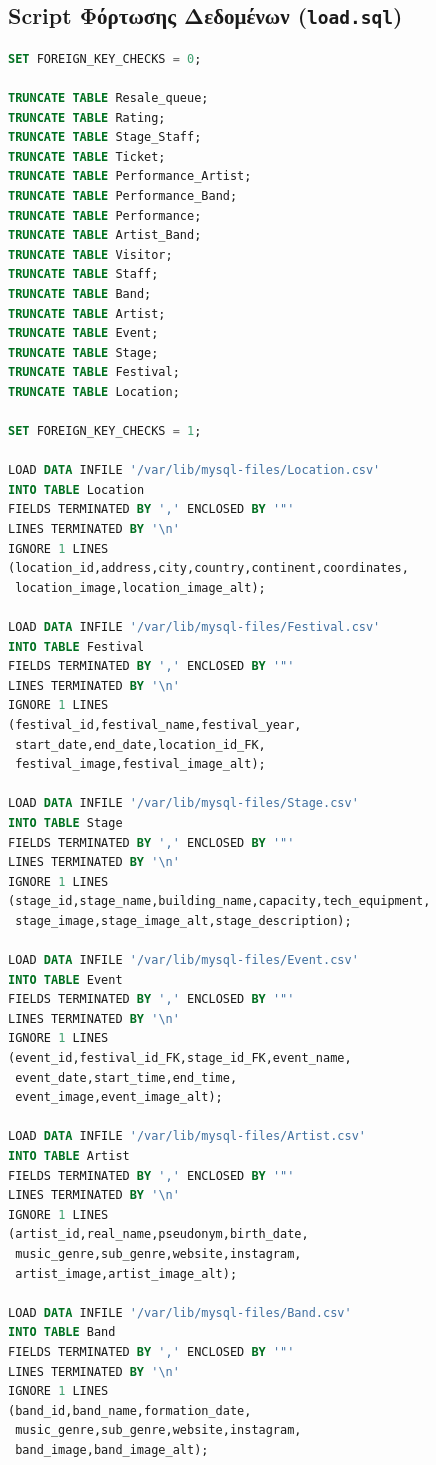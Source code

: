 \documentclass[a4paper,12pt]{article}
\begin{document}
\subsection{Script Φόρτωσης Δεδομένων (\texttt{load.sql})}
\begin{lstlisting}[language=SQL]
SET FOREIGN_KEY_CHECKS = 0;

TRUNCATE TABLE Resale_queue;
TRUNCATE TABLE Rating;
TRUNCATE TABLE Stage_Staff;
TRUNCATE TABLE Ticket;
TRUNCATE TABLE Performance_Artist;
TRUNCATE TABLE Performance_Band;
TRUNCATE TABLE Performance;
TRUNCATE TABLE Artist_Band;
TRUNCATE TABLE Visitor;
TRUNCATE TABLE Staff;
TRUNCATE TABLE Band;
TRUNCATE TABLE Artist;
TRUNCATE TABLE Event;
TRUNCATE TABLE Stage;
TRUNCATE TABLE Festival;
TRUNCATE TABLE Location;

SET FOREIGN_KEY_CHECKS = 1;

LOAD DATA INFILE '/var/lib/mysql-files/Location.csv'
INTO TABLE Location
FIELDS TERMINATED BY ',' ENCLOSED BY '"' 
LINES TERMINATED BY '\n'
IGNORE 1 LINES
(location_id,address,city,country,continent,coordinates,
 location_image,location_image_alt);

LOAD DATA INFILE '/var/lib/mysql-files/Festival.csv'
INTO TABLE Festival
FIELDS TERMINATED BY ',' ENCLOSED BY '"' 
LINES TERMINATED BY '\n'
IGNORE 1 LINES
(festival_id,festival_name,festival_year,
 start_date,end_date,location_id_FK,
 festival_image,festival_image_alt);

LOAD DATA INFILE '/var/lib/mysql-files/Stage.csv'
INTO TABLE Stage
FIELDS TERMINATED BY ',' ENCLOSED BY '"' 
LINES TERMINATED BY '\n'
IGNORE 1 LINES
(stage_id,stage_name,building_name,capacity,tech_equipment,
 stage_image,stage_image_alt,stage_description);

LOAD DATA INFILE '/var/lib/mysql-files/Event.csv'
INTO TABLE Event
FIELDS TERMINATED BY ',' ENCLOSED BY '"' 
LINES TERMINATED BY '\n'
IGNORE 1 LINES
(event_id,festival_id_FK,stage_id_FK,event_name,
 event_date,start_time,end_time,
 event_image,event_image_alt);

LOAD DATA INFILE '/var/lib/mysql-files/Artist.csv'
INTO TABLE Artist
FIELDS TERMINATED BY ',' ENCLOSED BY '"' 
LINES TERMINATED BY '\n'
IGNORE 1 LINES
(artist_id,real_name,pseudonym,birth_date,
 music_genre,sub_genre,website,instagram,
 artist_image,artist_image_alt);

LOAD DATA INFILE '/var/lib/mysql-files/Band.csv'
INTO TABLE Band
FIELDS TERMINATED BY ',' ENCLOSED BY '"' 
LINES TERMINATED BY '\n'
IGNORE 1 LINES
(band_id,band_name,formation_date,
 music_genre,sub_genre,website,instagram,
 band_image,band_image_alt);


\end{lstlisting}
\end{document}
